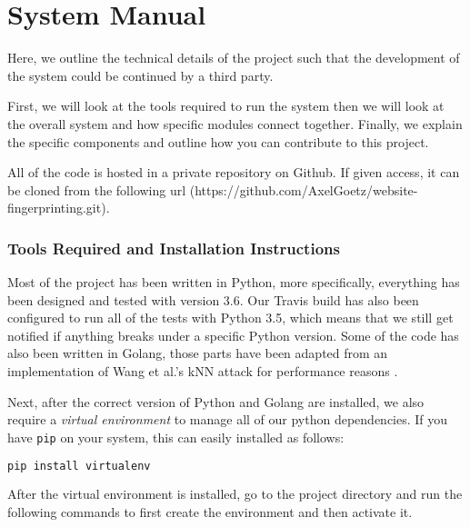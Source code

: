 \chapter{System Manual} \label{appendix:system-manual}

\begingroup

\renewcommand{\thesubsection}{\arabic{subsection}}

\renewcommand{\addcontentsline}[3]{}%

Here, we outline the technical details of the project such that the development of the system could be continued by a third party.

First, we will look at the tools required to run the system then we will look at the overall system and how specific modules connect together.
Finally, we explain the specific components and outline how you can contribute to this project.

All of the code is hosted in a private repository on Github.
If given access, it can be cloned from the following url (https://github.com/AxelGoetz/website-fingerprinting.git).

\subsection{Tools Required and Installation Instructions}

Most of the project has been written in Python, more specifically, everything has been designed and tested with version 3.6.
Our Travis build has also been configured to run all of the tests with Python 3.5, which means that we still get notified if anything breaks under a specific Python version.
Some of the code has also been written in Golang, those parts have been adapted from an implementation of Wang et al.'s kNN attack for performance reasons \cite{wang_cai_johnson_nithyanand_goldberg_2014,gokNN}.

Next, after the correct version of Python and Golang are installed, we also require a \textit{virtual environment} to manage all of our python dependencies.
If you have \texttt{pip} on your system, this can easily installed as follows:

\begin{lstlisting}[language=Bash]
pip install virtualenv
\end{lstlisting}

After the virtual environment is installed, go to the project directory and run the following commands to first create the environment and then activate it.

